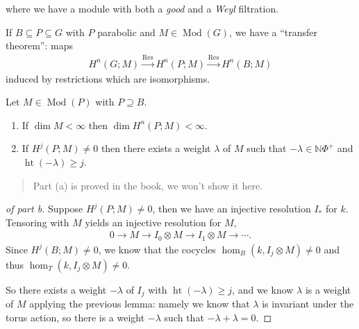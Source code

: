where we have a module with both a \emph{good} and a \emph{Weyl}
filtration.

If \(B\subseteq P \subseteq G\) with \(P\) parabolic and
\(M\in {\operatorname{Mod}}(G)\), we have a ``transfer theorem'': maps
\begin{align*}  
H^n(G; M) \xrightarrow{\operatorname{Res}} H^n(P; M) \xrightarrow{\operatorname{Res}} H^n(B; M)
\end{align*}
induced by restrictions which are isomorphisms.

\begin{proposition}[?]

Let \(M\in {\operatorname{Mod}}(P)\) with \(P\supseteq B\).

\begin{enumerate}
\def\labelenumi{\alph{enumi}.}
\item
  If \(\dim M < \infty\) then \(\dim H^n(P; M) < \infty\).
\item
  If \(H^j(P; M) \neq 0\) then there exists a weight \(\lambda\) of
  \(M\) such that \(-\lambda \in {\mathbb{N}}\Phi^+\) and
  \(\operatorname{ht}(-\lambda) \geq j\).
\end{enumerate}

\end{proposition}

\begin{quote}
Part (a) is proved in the book, we won't show it here.
\end{quote}

\begin{proof}[of part b]

Suppose \(H^j(P; M) \neq 0\), then we have an injective resolution
\(I_*\) for \(k\). Tensoring with \(M\) yields an injective resolution
for \(M\),
\begin{align*}  
0 \to M \to I_0\otimes M \to I_1 \otimes M \to \cdots
.\end{align*}
Since \(H^j(B; M) \neq 0\), we know that the cocycles
\(\hom_B(k, I_j\otimes M) \neq 0\) and thus
\(\hom_T(k, I_j\otimes M) \neq 0\).

So there exists a weight \(-\lambda\) of \(I_j\) with
\(\operatorname{ht}(-\lambda) \geq j\), and we know \(\lambda\) is a
weight of \(M\) applying the previous lemma: namely we know that
\(\lambda\) is invariant under the torus action, so there is a weight
\(-\lambda\) such that \(-\lambda + \lambda = 0\).

\end{proof}



